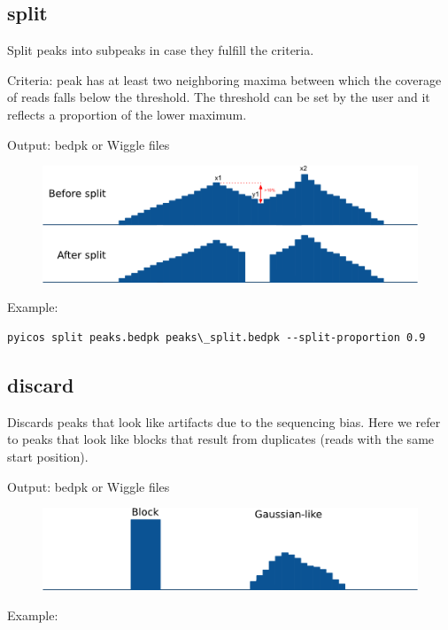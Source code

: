 \documentclass[letterpaper,10pt,english]{sphinxmanual}
\begin{document}
\subsection{split}
\label{pyicos:split}
Split peaks into subpeaks in case they fulfill the criteria.

Criteria: peak has at least two neighboring maxima between which the coverage of reads falls below the threshold. The threshold can be set by the user and it reflects a proportion of the lower maximum.

Output: bedpk or Wiggle files
\begin{figure}[htbp]
\centering

\includegraphics{Split.png}
\end{figure}

Example:

\begin{Verbatim}[commandchars=\\\{\}]
pyicos split peaks.bedpk peaks\_split.bedpk --split-proportion 0.9
\end{Verbatim}


\subsection{discard}
\label{pyicos:discard}
Discards peaks that look like artifacts due to the sequencing bias. Here we refer to peaks that look like blocks that result from duplicates (reads with the same start position).

Output: bedpk or Wiggle files
\begin{figure}[htbp]
\centering

\includegraphics{Artifact.png}
\end{figure}

Example:
\end{document}
